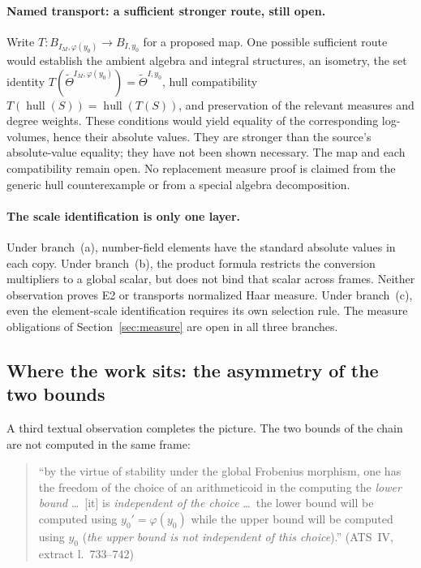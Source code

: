 \documentclass[11pt,a4paper]{article}
\theoremstyle{definition}
\theoremstyle{plain}
\theoremstyle{definition}
\newcommand{\anchor}[2]{(#1, extract l.~#2)}
\begin{document}
\paragraph{Named transport: a sufficient stronger route, still open.}
Write $T:B_{I_M,\varphi(y_0)}\longrightarrow B_{I,y_0}$ for a proposed map.
One possible sufficient route would establish the ambient algebra and integral
structures, an isometry, the set identity
$T(\widetilde\Theta^{I_M,\varphi(y_0)})=\widetilde\Theta^{I,y_0}$,
hull compatibility
$T(\operatorname{hull}(S))=\operatorname{hull}(T(S))$,
and preservation of the relevant measures and degree weights.
These conditions would yield equality of the corresponding log-volumes,
hence their absolute values. They are stronger than the source's
absolute-value equality; they have not been shown necessary.
The map and each compatibility remain open. No replacement measure proof is
claimed from the generic hull counterexample or from a special algebra
decomposition.

\paragraph{The scale identification is only one layer.}
Under branch~(a), number-field elements have the standard absolute values in
each copy. Under branch~(b), the product formula restricts the conversion
multipliers to a global scalar, but does not bind that scalar across frames.
Neither observation proves E2 or transports normalized Haar measure.
Under branch~(c), even the element-scale identification requires its own
selection rule. The measure obligations of Section~\ref{sec:measure} are
open in all three branches.

\subsection{Where the work sits: the asymmetry of the two bounds}

A third textual observation completes the picture. The two bounds of the chain are
not computed in the same frame:

\begin{quote}\small
``by the virtue of stability under the global Frobenius morphism, one has the
freedom of the choice of an arithmeticoid in the computing the \emph{lower bound}
\ldots\ [it] is \emph{independent of the choice} \ldots\ the lower bound will be
computed using $y_0' = \varphi(y_0)$ while the upper bound will be computed using
$y_0$ (\emph{the upper bound is not independent of this choice}).''
\hfill\anchor{ATS~IV}{733--742}
\end{quote}
\end{document}
